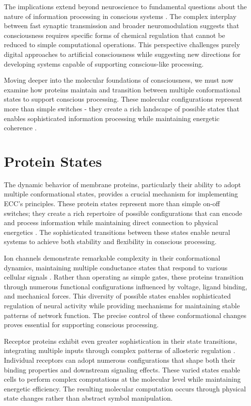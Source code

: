 \begin{refsection}
The implications extend beyond neuroscience to fundamental questions about the nature of information processing in conscious systems \cite{Dayan2012}. The complex interplay between fast synaptic transmission and broader neuromodulation suggests that consciousness requires specific forms of chemical regulation that cannot be reduced to simple computational operations. This perspective challenges purely digital approaches to artificial consciousness while suggesting new directions for developing systems capable of supporting conscious-like processing.

Moving deeper into the molecular foundations of consciousness, we must now examine how proteins maintain and transition between multiple conformational states to support conscious processing. These molecular configurations represent more than simple switches - they create a rich landscape of possible states that enables sophisticated information processing while maintaining energetic coherence \cite{Nadim2014}.

\section{Protein States}

The dynamic behavior of membrane proteins, particularly their ability to adopt multiple conformational states, provides a crucial mechanism for implementing ECC's principles. These protein states represent more than simple on-off switches; they create a rich repertoire of possible configurations that can encode and process information while maintaining direct connection to physical energetics \cite{Balchin2016}. The sophisticated transitions between these states enable neural systems to achieve both stability and flexibility in conscious processing.

Ion channels demonstrate remarkable complexity in their conformational dynamics, maintaining multiple conductance states that respond to various cellular signals \cite{Henzler-Wildman2007}. Rather than operating as simple gates, these proteins transition through numerous functional configurations influenced by voltage, ligand binding, and mechanical forces. This diversity of possible states enables sophisticated regulation of neural activity while providing mechanisms for maintaining stable patterns of network function. The precise control of these conformational changes proves essential for supporting conscious processing.

Receptor proteins exhibit even greater sophistication in their state transitions, integrating multiple inputs through complex patterns of allosteric regulation \cite{Nussinov2013}. Individual receptors can adopt numerous configurations that shape both their binding properties and downstream signaling effects. These varied states enable cells to perform complex computations at the molecular level while maintaining energetic efficiency. The resulting molecular computation occurs through physical state changes rather than abstract symbol manipulation.


\end{refsection}
